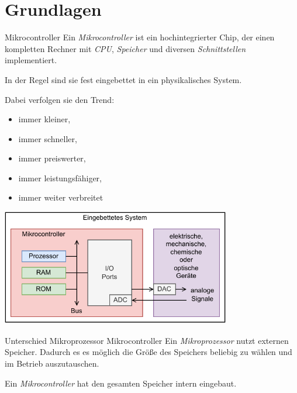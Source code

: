 \section{Grundlagen}

\begin{defi}{Mikrocontroller}
    Ein \emph{Mikrocontroller} ist ein hochintegrierter Chip, der einen kompletten Rechner mit \emph{CPU}, \emph{Speicher} und diversen \emph{Schnittstellen} implementiert.

    In der Regel sind sie fest eingebettet in ein physikalisches System.

    Dabei verfolgen sie den Trend:
    \begin{itemize}
        \item immer kleiner,
        \item immer schneller,
        \item immer preiswerter,
        \item immer leistungsfähiger,
        \item immer weiter verbreitet
    \end{itemize}

    \vspace{1em}

    \begin{center}
        \includegraphics[width=0.75\textwidth]{includes/figures/microcontroller.pdf}
    \end{center}
\end{defi}

\begin{bonus}{Unterschied Mikroprozessor Mikrocontroller}
    Ein \emph{Mikroprozessor} nutzt externen Speicher.
    Dadurch es es möglich die Größe des Speichers beliebig zu wählen und im Betrieb auszutauschen.

    Ein \emph{Mikrocontroller} hat den gesamten Speicher intern eingebaut.
\end{bonus}

